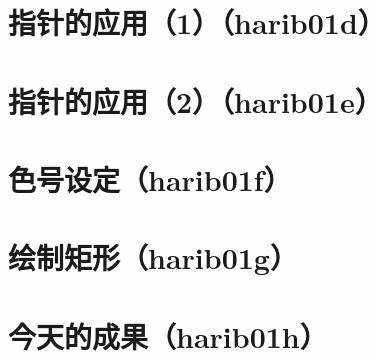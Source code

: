 \section{	指针的应用（1）（harib01d）	}
\section{	指针的应用（2）（harib01e）	}
\section{	色号设定（harib01f）	}
\section{	绘制矩形（harib01g）	}
\section{	今天的成果（harib01h）	}

